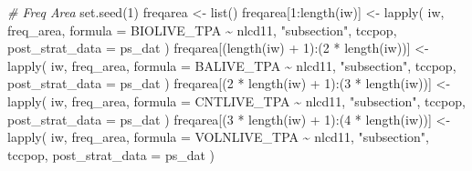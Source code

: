 \documentclass[12pt,twoside]{reedthesis}
\newenvironment{Shaded}{\begin{snugshade}}{\end{snugshade}}
\newcommand{\AttributeTok}[1]{\textcolor[rgb]{0.77,0.63,0.00}{#1}}
\newcommand{\CommentTok}[1]{\textcolor[rgb]{0.56,0.35,0.01}{\textit{#1}}}
\newcommand{\DecValTok}[1]{\textcolor[rgb]{0.00,0.00,0.81}{#1}}
\newcommand{\FunctionTok}[1]{\textcolor[rgb]{0.00,0.00,0.00}{#1}}
\newcommand{\NormalTok}[1]{#1}
\newcommand{\OtherTok}[1]{\textcolor[rgb]{0.56,0.35,0.01}{#1}}
\newcommand{\SpecialCharTok}[1]{\textcolor[rgb]{0.00,0.00,0.00}{#1}}
\newcommand{\StringTok}[1]{\textcolor[rgb]{0.31,0.60,0.02}{#1}}
\begin{document}
\begin{Shaded}
\begin{Highlighting}[]
\CommentTok{\# Freq Area}
\FunctionTok{set.seed}\NormalTok{(}\DecValTok{1}\NormalTok{)}
\NormalTok{freqarea }\OtherTok{\textless{}{-}} \FunctionTok{list}\NormalTok{()}
\NormalTok{freqarea[}\DecValTok{1}\SpecialCharTok{:}\FunctionTok{length}\NormalTok{(iw)] }\OtherTok{\textless{}{-}}
  \FunctionTok{lapply}\NormalTok{(}
\NormalTok{    iw,}
\NormalTok{    freq\_area,}
    \AttributeTok{formula =}\NormalTok{ BIOLIVE\_TPA }\SpecialCharTok{\textasciitilde{}}\NormalTok{ nlcd11,}
    \StringTok{"subsection"}\NormalTok{,}
\NormalTok{    tccpop,}
    \AttributeTok{post\_strat\_data =}\NormalTok{ ps\_dat}
\NormalTok{)}
\NormalTok{freqarea[(}\FunctionTok{length}\NormalTok{(iw) }\SpecialCharTok{+} \DecValTok{1}\NormalTok{)}\SpecialCharTok{:}\NormalTok{(}\DecValTok{2} \SpecialCharTok{*} \FunctionTok{length}\NormalTok{(iw))] }\OtherTok{\textless{}{-}} 
  \FunctionTok{lapply}\NormalTok{(}
\NormalTok{    iw,}
\NormalTok{    freq\_area,}
    \AttributeTok{formula =}\NormalTok{ BALIVE\_TPA }\SpecialCharTok{\textasciitilde{}}\NormalTok{ nlcd11,}
    \StringTok{"subsection"}\NormalTok{,}
\NormalTok{    tccpop,}
    \AttributeTok{post\_strat\_data =}\NormalTok{ ps\_dat}
\NormalTok{)}
\NormalTok{freqarea[(}\DecValTok{2} \SpecialCharTok{*} \FunctionTok{length}\NormalTok{(iw) }\SpecialCharTok{+} \DecValTok{1}\NormalTok{)}\SpecialCharTok{:}\NormalTok{(}\DecValTok{3} \SpecialCharTok{*} \FunctionTok{length}\NormalTok{(iw))] }\OtherTok{\textless{}{-}}
  \FunctionTok{lapply}\NormalTok{(}
\NormalTok{    iw,}
\NormalTok{    freq\_area,}
    \AttributeTok{formula =}\NormalTok{ CNTLIVE\_TPA }\SpecialCharTok{\textasciitilde{}}\NormalTok{ nlcd11,}
    \StringTok{"subsection"}\NormalTok{,}
\NormalTok{    tccpop,}
    \AttributeTok{post\_strat\_data =}\NormalTok{ ps\_dat}
\NormalTok{)}
\NormalTok{freqarea[(}\DecValTok{3} \SpecialCharTok{*} \FunctionTok{length}\NormalTok{(iw) }\SpecialCharTok{+} \DecValTok{1}\NormalTok{)}\SpecialCharTok{:}\NormalTok{(}\DecValTok{4} \SpecialCharTok{*} \FunctionTok{length}\NormalTok{(iw))] }\OtherTok{\textless{}{-}}
  \FunctionTok{lapply}\NormalTok{(}
\NormalTok{    iw,}
\NormalTok{    freq\_area,}
    \AttributeTok{formula =}\NormalTok{ VOLNLIVE\_TPA }\SpecialCharTok{\textasciitilde{}}\NormalTok{ nlcd11,}
    \StringTok{"subsection"}\NormalTok{,}
\NormalTok{    tccpop,}
    \AttributeTok{post\_strat\_data =}\NormalTok{ ps\_dat}
\NormalTok{)}


\end{Highlighting}
\end{Shaded}
\end{document}

